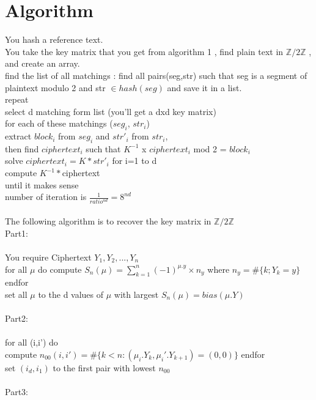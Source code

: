 \documentclass{article}
\begin{document}
\section{Algorithm}
You hash a reference text.\\
You take the key matrix that you get from algorithm 1 , find plain text in $\mathbb{Z}/2\mathbb{Z}$ , and create an array.\\
find the list of all matchings : find all pairs(seg,str) such that seg is a segment of plaintext modulo 2 and str $\in hash(seg)$ and save it in a list.\\
repeat\\
select d matching form list (you'll get a dxd key matrix)\\
for each of these matchings ($seg_{i}$, $str_{i}$)\\
extract $block_{i}$ from $seg_{i}$ and $str'_{i}$ from $str_{i}$,\\
then find $ciphertext_{i}$ such that $K^{-1}$ x $ciphertext_{i}$ mod 2 = $block_{i}$\\
solve $ciphertext_{i} = K * str'_{i}$ for i=1 to d\\
compute $K^{-1} * $ciphertext\\
until it makes sense\\
number of iteration is $ \frac{1}{ratio^{nd}} = 8^{nd}$
\\
\\
The following algorithm is to recover the key matrix in $\mathbb{Z}/2\mathbb{Z}$\\
Part1:\\
\\
You require Ciphertext $Y_1,Y_2,...,Y_n$\\
for all $\mu$ do
compute $S_n(\mu) = \sum_{k=1}^{n}{(-1)^{\mu.y} \times n_y}$ where $n_y=\#\{k;Y_k=y\}$\\
endfor\\
set all $\mu$ to the d values of $\mu$ with largest $S_n(\mu)=bias(\mu.Y)$\\
\\
Part2:\\
\\
for all (i,i') do\\
compute $n_{00}(i,i')=\#\{k<n:(\mu_i .Y_k,\mu_i'.Y_{k+1})=(0,0)\}$
endfor\\
set $(i_d,i_1)$ to the first pair with lowest $n_{00}$\\
\\
Part3:\\
\\
\end{document}
